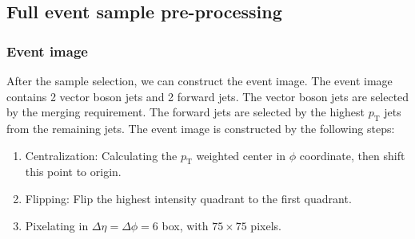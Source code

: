 \documentclass[12pt]{article}
\begin{document}
	\subsection{Full event sample pre-processing}%
	\label{sub:full_event_sample_pre_processing}
		\subsubsection{Event image}%
		\label{subs:event_image}
			After the sample selection, we can construct the event image. The event image contains 2 vector boson jets and 2 forward jets. The vector boson jets are selected by the merging requirement. The forward jets are selected by the highest $p_\text{T}$ jets from the remaining jets. The event image is constructed by the following steps:
			\begin{enumerate}
				\item Centralization: Calculating the $p_\text{T}$ weighted center in $\phi$ coordinate, then shift this point to origin.
				\item Flipping: Flip the highest intensity quadrant to the first quadrant. 
				\item Pixelating in $\Delta\eta = \Delta\phi = 6$ box, with $75\times 75$ pixels.
			\end{enumerate}
\end{document}
